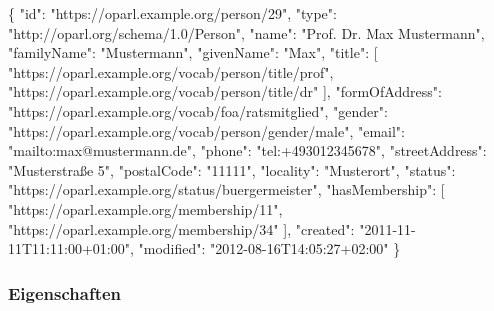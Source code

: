\documentclass[,a4paper]{article}
\newenvironment{Shaded}{}{}
\newcommand{\DataTypeTok}[1]{\textcolor[rgb]{0.56,0.13,0.00}{{#1}}}
\newcommand{\StringTok}[1]{\textcolor[rgb]{0.25,0.44,0.63}{{#1}}}
\newcommand{\OtherTok}[1]{\textcolor[rgb]{0.00,0.44,0.13}{{#1}}}
\newcommand{\FunctionTok}[1]{\textcolor[rgb]{0.02,0.16,0.49}{{#1}}}
\begin{document}
\begin{Shaded}
\begin{Highlighting}[]
\FunctionTok{\{}
    \DataTypeTok{"id"}\FunctionTok{:} \StringTok{"https://oparl.example.org/person/29"}\FunctionTok{,}
    \DataTypeTok{"type"}\FunctionTok{:} \StringTok{"http://oparl.org/schema/1.0/Person"}\FunctionTok{,}
    \DataTypeTok{"name"}\FunctionTok{:} \StringTok{"Prof. Dr. Max Mustermann"}\FunctionTok{,}
    \DataTypeTok{"familyName"}\FunctionTok{:} \StringTok{"Mustermann"}\FunctionTok{,}
    \DataTypeTok{"givenName"}\FunctionTok{:} \StringTok{"Max"}\FunctionTok{,}
    \DataTypeTok{"title"}\FunctionTok{:} \OtherTok{[}
        \StringTok{"https://oparl.example.org/vocab/person/title/prof"}\OtherTok{,}
        \StringTok{"https://oparl.example.org/vocab/person/title/dr"}
    \OtherTok{]}\FunctionTok{,}
    \DataTypeTok{"formOfAddress"}\FunctionTok{:} \StringTok{"https://oparl.example.org/vocab/foa/ratsmitglied"}\FunctionTok{,}
    \DataTypeTok{"gender"}\FunctionTok{:} \StringTok{"https://oparl.example.org/vocab/person/gender/male"}\FunctionTok{,}
    \DataTypeTok{"email"}\FunctionTok{:} \StringTok{"mailto:max@mustermann.de"}\FunctionTok{,}
    \DataTypeTok{"phone"}\FunctionTok{:} \StringTok{"tel:+493012345678"}\FunctionTok{,}
    \DataTypeTok{"streetAddress"}\FunctionTok{:} \StringTok{"Musterstraße 5"}\FunctionTok{,}
    \DataTypeTok{"postalCode"}\FunctionTok{:} \StringTok{"11111"}\FunctionTok{,}
    \DataTypeTok{"locality"}\FunctionTok{:} \StringTok{"Musterort"}\FunctionTok{,}
    \DataTypeTok{"status"}\FunctionTok{:} \StringTok{"https://oparl.example.org/status/buergermeister"}\FunctionTok{,}
    \DataTypeTok{"hasMembership"}\FunctionTok{:} \OtherTok{[}
        \StringTok{"https://oparl.example.org/membership/11"}\OtherTok{,}
        \StringTok{"https://oparl.example.org/membership/34"}
    \OtherTok{]}\FunctionTok{,}
    \DataTypeTok{"created"}\FunctionTok{:} \StringTok{"2011-11-11T11:11:00+01:00"}\FunctionTok{,}
    \DataTypeTok{"modified"}\FunctionTok{:} \StringTok{"2012-08-16T14:05:27+02:00"}
\FunctionTok{\}}
\end{Highlighting}
\end{Shaded}

\subsubsection{Eigenschaften}\label{eigenschaften-3}
\end{document}
